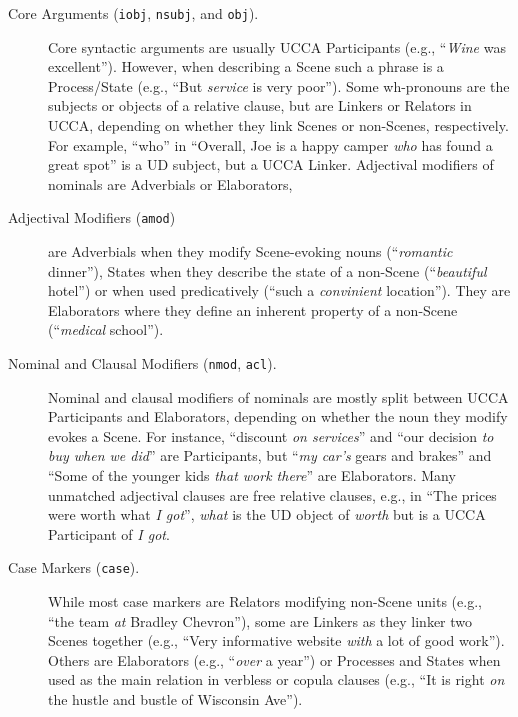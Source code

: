 \documentclass[11pt,a4paper]{article}
\begin{document}
\begin{description}
    \item[Core Arguments (\texttt{iobj}, \texttt{nsubj}, and \texttt{obj}).] 
      Core syntactic arguments are usually UCCA Participants (e.g., ``\textit{Wine} was excellent'').
      However, when describing a Scene such a phrase is a Process/State
      (e.g., ``But \textit{service} is very poor'').
      Some wh-pronouns are the subjects or objects of a relative clause, but
      are Linkers or Relators in UCCA,
      depending on whether they link Scenes or non-Scenes, respectively.
      For example, ``who'' in ``Overall, Joe is a happy camper \textit{who} has found a great spot'' is a UD
      subject, but a UCCA Linker.
      Adjectival modifiers of nominals are Adverbials or Elaborators,

    \item[Adjectival Modifiers (\texttt{amod})] are Adverbials when they modify Scene-evoking
    nouns (``\textit{romantic} dinner''), States when they describe the state of
    a non-Scene (``\textit{beautiful} hotel'') or when used predicatively (``such a \textit{convinient} location'').
    They are Elaborators where they define an inherent property of a non-Scene (``\textit{medical} school'').

    \item[Nominal and Clausal Modifiers (\texttt{nmod}, \texttt{acl}).] 
    Nominal and clausal modifiers of nominals
    are mostly split between UCCA Participants and Elaborators,
    depending on whether the noun they modify evokes a Scene. For instance, 
    ``discount \textit{on services}'' and
    ``our decision \textit{to buy when we did}'' are Participants,
    but ``\textit{my car's} gears and brakes'' and ``Some of the younger kids \textit{that work there}'' are Elaborators.
    Many unmatched adjectival clauses are
    free relative clauses, e.g., in ``The prices were worth what \textit{I got}'',
    \textit{what} is the UD object of \textit{worth} but
    is a UCCA Participant of \textit{I got}.

    \item[Case Markers (\texttt{case}).]
      While most case markers are Relators
      modifying non-Scene units (e.g., ``the team \textit{at} Bradley Chevron''),
      some are Linkers as they linker two Scenes together 
      (e.g., ``Very informative website \textit{with} a lot of good work'').
      Others are Elaborators (e.g., ``\textit{over} a year'') or Processes and States
      when used as the main relation in verbless or copula clauses
      (e.g., ``It is right \textit{on} the hustle and bustle of Wisconsin Ave'').
    

\end{description}
\end{document}
